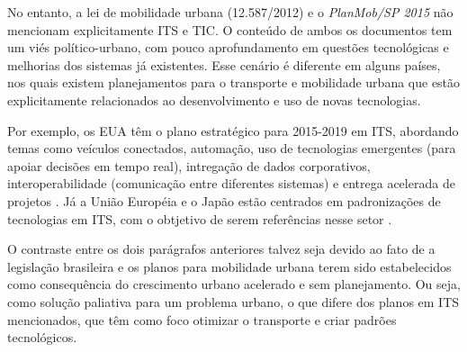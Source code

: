 \documentclass[
	12pt,				%
	oneside,			%
	a4paper,			%
	english,			%
	brazil				%
	]{abntex2ppgsi}
\begin{document}
No entanto, a lei de mobilidade urbana (12.587/2012) e o \textit{PlanMob/SP 2015} não mencionam explicitamente ITS e TIC. O conteúdo de ambos os documentos tem um viés político-urbano, com pouco aprofundamento em questões tecnológicas e melhorias dos sistemas já existentes. Esse cenário é diferente em alguns países, nos quais existem planejamentos para o transporte e mobilidade urbana que estão explicitamente relacionados ao desenvolvimento e uso de novas tecnologias.

Por exemplo, os EUA têm o plano estratégico para 2015-2019 em ITS, abordando temas como veículos conectados, automação, uso de tecnologias emergentes (para apoiar decisões em tempo real), intregação de dados corporativos, interoperabilidade (comunicação entre diferentes sistemas) e entrega acelerada de projetos \cite{itsdot}. Já a União Européia e o Japão estão centrados em padronizações de tecnologias em ITS, com o obtjetivo de serem referências nesse setor \cite{consulo2016evaluation}.

O contraste entre os dois parágrafos anteriores talvez seja devido ao fato de a legislação brasileira e os planos para mobilidade urbana terem sido estabelecidos como consequência do crescimento urbano acelerado e sem planejamento. Ou seja, como solução paliativa para um problema urbano, o que difere dos planos em ITS mencionados, que têm como foco otimizar o transporte e criar padrões tecnológicos. 
\end{document}
